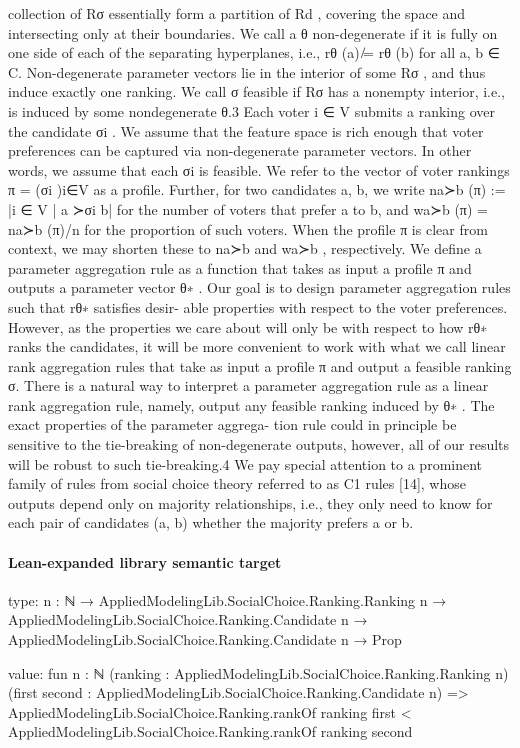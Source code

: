 \documentclass[10pt]{article}
\begin{document}
\begin{ReviewVerbatim}
collection of {Rσ } essentially form a partition of Rd , covering the space and intersecting only at
their boundaries.
We call a θ non-degenerate if it is fully on one side of each of the separating hyperplanes, i.e.,
rθ (a) ̸= rθ (b) for all a, b ∈ C. Non-degenerate parameter vectors lie in the interior of some Rσ ,
and thus induce exactly one ranking. We call σ feasible if Rσ has a nonempty interior, i.e., is induced
by some nondegenerate θ.3
Each voter i ∈ V submits a ranking over the candidate σi . We assume that the feature space is
rich enough that voter preferences can be captured via non-degenerate parameter vectors. In other
words, we assume that each σi is feasible. We refer to the vector of voter rankings π = (σi )i∈V as
a profile. Further, for two candidates a, b, we write na≻b (π) := |{i ∈ V | a ≻σi b}| for the number
of voters that prefer a to b, and wa≻b (π) = na≻b (π)/n for the proportion of such voters. When the
profile π is clear from context, we may shorten these to na≻b and wa≻b , respectively.
We define a parameter aggregation rule as a function that takes as input a profile π and outputs a
parameter vector θ∗ . Our goal is to design parameter aggregation rules such that rθ∗ satisfies desir-
able properties with respect to the voter preferences. However, as the properties we care about will
only be with respect to how rθ∗ ranks the candidates, it will be more convenient to work with what
we call linear rank aggregation rules that take as input a profile π and output a feasible ranking σ.
There is a natural way to interpret a parameter aggregation rule as a linear rank aggregation rule,
namely, output any feasible ranking induced by θ∗ . The exact properties of the parameter aggrega-
tion rule could in principle be sensitive to the tie-breaking of non-degenerate outputs, however, all
of our results will be robust to such tie-breaking.4
We pay special attention to a prominent family of rules from social choice theory referred to as C1
rules [14], whose outputs depend only on majority relationships, i.e., they only need to know for
each pair of candidates (a, b) whether the majority prefers a or b.
\end{ReviewVerbatim}



\paragraph{Lean-expanded library semantic target}
\begin{ReviewVerbatim}
type:
{n : ℕ} →
  AppliedModelingLib.SocialChoice.Ranking.Ranking n →
    AppliedModelingLib.SocialChoice.Ranking.Candidate n → AppliedModelingLib.SocialChoice.Ranking.Candidate n → Prop

value:
fun {n : ℕ} (ranking : AppliedModelingLib.SocialChoice.Ranking.Ranking n)
    (first second : AppliedModelingLib.SocialChoice.Ranking.Candidate n) =>
  AppliedModelingLib.SocialChoice.Ranking.rankOf ranking first <
    AppliedModelingLib.SocialChoice.Ranking.rankOf ranking second
\end{ReviewVerbatim}
\end{document}
